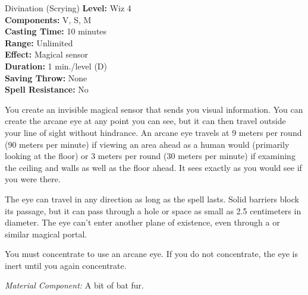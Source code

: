 {Divination (Scrying)}
{
	\textbf{Level:}
	Wiz 4\\
	\textbf{Components:}
	V, S, M\\
	\textbf{Casting Time:}
	10 minutes\\
	\textbf{Range:}
	Unlimited\\
	\textbf{Effect:}
	Magical sensor\\
	\textbf{Duration:}
	1 min./level (D)\\
	\textbf{Saving Throw:}
	None\\
	\textbf{Spell Resistance:}
	No\\
}
{
	You create an invisible magical sensor that sends you visual information. You can create the arcane eye at any point you can see, but it can then travel outside your line of sight without hindrance. An arcane eye travels at 9 meters per round (90 meters per minute) if viewing an area ahead as a human would (primarily looking at the floor) or 3 meters per round (30 meters per minute) if examining the ceiling and walls as well as the floor ahead. It sees exactly as you would see if you were there.

	The eye can travel in any direction as long as the spell lasts. Solid barriers block its passage, but it can pass through a hole or space as small as 2.5 centimeters in diameter. The eye can't enter another plane of existence, even through a  or similar magical portal.

	You must concentrate to use an arcane eye. If you do not concentrate, the eye is inert until you again concentrate.

	\textit{Material Component:}
	A bit of bat fur.

}
